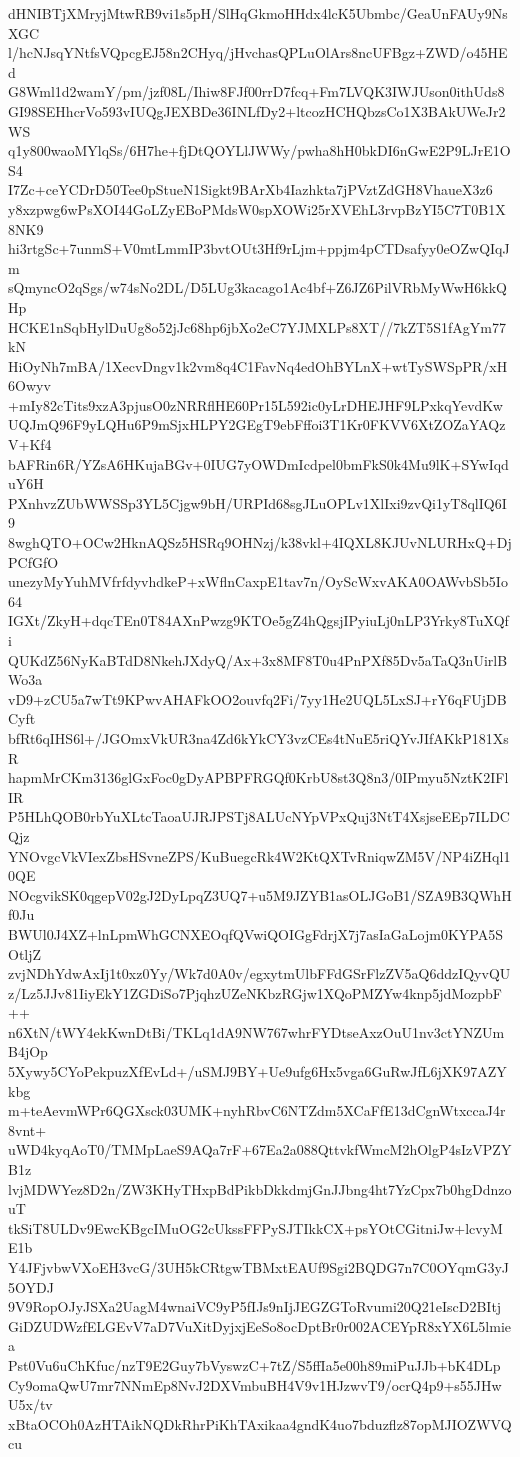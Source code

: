dHNIBTjXMryjMtwRB9vi1s5pH/SlHqGkmoHHdx4lcK5Ubmbc/GeaUnFAUy9NsXGC
l/hcNJsqYNtfsVQpcgEJ58n2CHyq/jHvchasQPLuOlArs8ncUFBgz+ZWD/o45HEd
G8Wml1d2wamY/pm/jzf08L/Ihiw8FJf00rrD7fcq+Fm7LVQK3IWJUson0ithUds8
GI98SEHhcrVo593vIUQgJEXBDe36INLfDy2+ltcozHCHQbzsCo1X3BAkUWeJr2WS
q1y800waoMYlqSs/6H7he+fjDtQOYLlJWWy/pwha8hH0bkDI6nGwE2P9LJrE1OS4
I7Zc+ceYCDrD50Tee0pStueN1Sigkt9BArXb4Iazhkta7jPVztZdGH8VhaueX3z6
y8xzpwg6wPsXOI44GoLZyEBoPMdsW0spXOWi25rXVEhL3rvpBzYI5C7T0B1X8NK9
hi3rtgSc+7unmS+V0mtLmmIP3bvtOUt3Hf9rLjm+ppjm4pCTDsafyy0eOZwQIqJm
sQmyncO2qSgs/w74sNo2DL/D5LUg3kacago1Ac4bf+Z6JZ6PilVRbMyWwH6kkQHp
HCKE1nSqbHylDuUg8o52jJc68hp6jbXo2eC7YJMXLPs8XT//7kZT5S1fAgYm77kN
HiOyNh7mBA/1XecvDngv1k2vm8q4C1FavNq4edOhBYLnX+wtTySWSpPR/xH6Owyv
+mIy82cTits9xzA3pjusO0zNRRflHE60Pr15L592ic0yLrDHEJHF9LPxkqYevdKw
UQJmQ96F9yLQHu6P9mSjxHLPY2GEgT9ebFffoi3T1Kr0FKVV6XtZOZaYAQzV+Kf4
bAFRin6R/YZsA6HKujaBGv+0IUG7yOWDmIcdpel0bmFkS0k4Mu9lK+SYwIqduY6H
PXnhvzZUbWWSSp3YL5Cjgw9bH/URPId68sgJLuOPLv1XlIxi9zvQi1yT8qlIQ6I9
8wghQTO+OCw2HknAQSz5HSRq9OHNzj/k38vkl+4IQXL8KJUvNLURHxQ+DjPCfGfO
unezyMyYuhMVfrfdyvhdkeP+xWflnCaxpE1tav7n/OyScWxvAKA0OAWvbSb5Io64
IGXt/ZkyH+dqcTEn0T84AXnPwzg9KTOe5gZ4hQgsjIPyiuLj0nLP3Yrky8TuXQfi
QUKdZ56NyKaBTdD8NkehJXdyQ/Ax+3x8MF8T0u4PnPXf85Dv5aTaQ3nUirlBWo3a
vD9+zCU5a7wTt9KPwvAHAFkOO2ouvfq2Fi/7yy1He2UQL5LxSJ+rY6qFUjDBCyft
bfRt6qIHS6l+/JGOmxVkUR3na4Zd6kYkCY3vzCEs4tNuE5riQYvJIfAKkP181XsR
hapmMrCKm3136glGxFoc0gDyAPBPFRGQf0KrbU8st3Q8n3/0IPmyu5NztK2IFlIR
P5HLhQOB0rbYuXLtcTaoaUJRJPSTj8ALUcNYpVPxQuj3NtT4XsjseEEp7ILDCQjz
YNOvgcVkVIexZbsHSvneZPS/KuBuegcRk4W2KtQXTvRniqwZM5V/NP4iZHql10QE
NOcgvikSK0qgepV02gJ2DyLpqZ3UQ7+u5M9JZYB1asOLJGoB1/SZA9B3QWhHf0Ju
BWUl0J4XZ+lnLpmWhGCNXEOqfQVwiQOIGgFdrjX7j7asIaGaLojm0KYPA5SOtljZ
zvjNDhYdwAxIj1t0xz0Yy/Wk7d0A0v/egxytmUlbFFdGSrFlzZV5aQ6ddzIQyvQU
z/Lz5JJv81IiyEkY1ZGDiSo7PjqhzUZeNKbzRGjw1XQoPMZYw4knp5jdMozpbF++
n6XtN/tWY4ekKwnDtBi/TKLq1dA9NW767whrFYDtseAxzOuU1nv3ctYNZUmB4jOp
5Xywy5CYoPekpuzXfEvLd+/uSMJ9BY+Ue9ufg6Hx5vga6GuRwJfL6jXK97AZYkbg
m+teAevmWPr6QGXsck03UMK+nyhRbvC6NTZdm5XCaFfE13dCgnWtxccaJ4r8vnt+
uWD4kyqAoT0/TMMpLaeS9AQa7rF+67Ea2a088QttvkfWmcM2hOlgP4sIzVPZYB1z
lvjMDWYez8D2n/ZW3KHyTHxpBdPikbDkkdmjGnJJbng4ht7YzCpx7b0hgDdnzouT
tkSiT8ULDv9EwcKBgcIMuOG2cUkssFFPySJTIkkCX+psYOtCGitniJw+lcvyME1b
Y4JFjvbwVXoEH3vcG/3UH5kCRtgwTBMxtEAUf9Sgi2BQDG7n7C0OYqmG3yJ5OYDJ
9V9RopOJyJSXa2UagM4wnaiVC9yP5fIJs9nIjJEGZGToRvumi20Q21eIscD2BItj
GiDZUDWzfELGEvV7aD7VuXitDyjxjEeSo8ocDptBr0r002ACEYpR8xYX6L5lmiea
Pst0Vu6uChKfuc/nzT9E2Guy7bVyswzC+7tZ/S5ffIa5e00h89miPuJJb+bK4DLp
Cy9omaQwU7mr7NNmEp8NvJ2DXVmbuBH4V9v1HJzwvT9/ocrQ4p9+s55JHwU5x/tv
xBtaOCOh0AzHTAikNQDkRhrPiKhTAxikaa4gndK4uo7bduzflz87opMJIOZWVQcu

